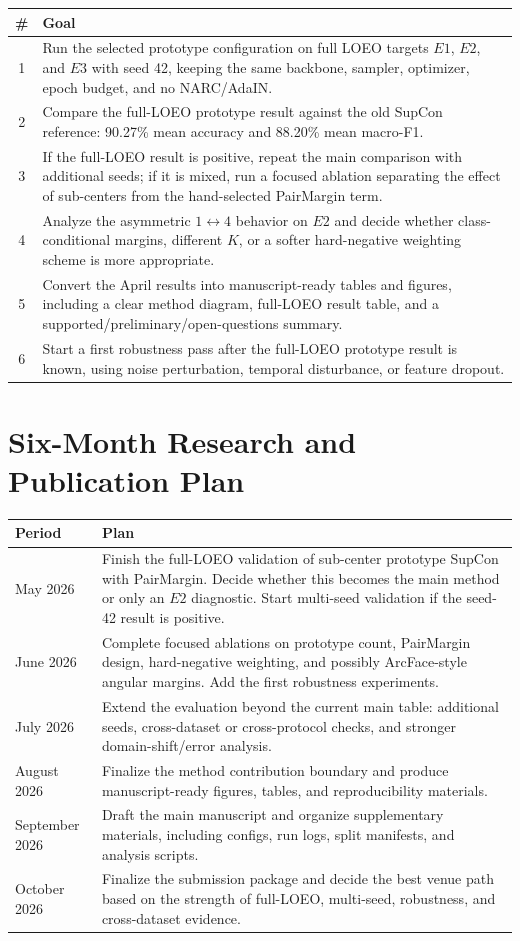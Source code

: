 \documentclass[11pt]{article}
\newcommand{\code}[1]{\texttt{\detokenize{#1}}}
\begin{document}
\begin{longtable}{@{}cp{5.75in}@{}}
\toprule
\# & Goal \\
\midrule
\endhead
1 & Run the selected \code{K=3 + PairMargin} prototype configuration on full LOEO targets $E1$, $E2$, and $E3$ with seed 42, keeping the same backbone, sampler, optimizer, epoch budget, and no NARC/AdaIN. \\
2 & Compare the full-LOEO prototype result against the old SupCon reference: 90.27\% mean accuracy and 88.20\% mean macro-F1. \\
3 & If the full-LOEO result is positive, repeat the main comparison with additional seeds; if it is mixed, run a focused ablation separating the effect of sub-centers from the hand-selected PairMargin term. \\
4 & Analyze the asymmetric $1 \leftrightarrow 4$ behavior on $E2$ and decide whether class-conditional margins, different $K$, or a softer hard-negative weighting scheme is more appropriate. \\
5 & Convert the April results into manuscript-ready tables and figures, including a clear method diagram, full-LOEO result table, and a supported/preliminary/open-questions summary. \\
6 & Start a first robustness pass after the full-LOEO prototype result is known, using noise perturbation, temporal disturbance, or feature dropout. \\
\bottomrule
\end{longtable}

\section{Six-Month Research and Publication Plan}

\begin{longtable}{@{}p{0.95in}p{5.35in}@{}}
\toprule
Period & Plan \\
\midrule
\endhead
May 2026 & Finish the full-LOEO validation of sub-center prototype SupCon with PairMargin. Decide whether this becomes the main method or only an $E2$ diagnostic. Start multi-seed validation if the seed-42 result is positive. \\
June 2026 & Complete focused ablations on prototype count, PairMargin design, hard-negative weighting, and possibly ArcFace-style angular margins. Add the first robustness experiments. \\
July 2026 & Extend the evaluation beyond the current main table: additional seeds, cross-dataset or cross-protocol checks, and stronger domain-shift/error analysis. \\
August 2026 & Finalize the method contribution boundary and produce manuscript-ready figures, tables, and reproducibility materials. \\
September 2026 & Draft the main manuscript and organize supplementary materials, including configs, run logs, split manifests, and analysis scripts. \\
October 2026 & Finalize the submission package and decide the best venue path based on the strength of full-LOEO, multi-seed, robustness, and cross-dataset evidence. \\
\bottomrule
\end{longtable}
\end{document}

